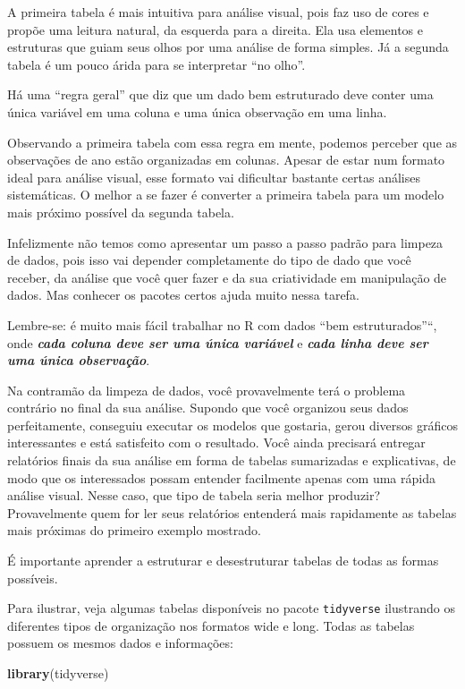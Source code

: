 \documentclass[]{book}
\newenvironment{Shaded}{\begin{snugshade}}{\end{snugshade}}
\newcommand{\KeywordTok}[1]{\textcolor[rgb]{0.13,0.29,0.53}{\textbf{#1}}}
\newcommand{\NormalTok}[1]{#1}
\begin{document}
A primeira tabela é mais intuitiva para análise visual, pois faz uso de
cores e propõe uma leitura natural, da esquerda para a direita. Ela usa
elementos e estruturas que guiam seus olhos por uma análise de forma
simples. Já a segunda tabela é um pouco árida para se interpretar ``no
olho''.

Há uma ``regra geral'' que diz que um dado bem estruturado deve conter
uma única variável em uma coluna e uma única observação em uma linha.

Observando a primeira tabela com essa regra em mente, podemos perceber
que as observações de ano estão organizadas em colunas. Apesar de estar
num formato ideal para análise visual, esse formato vai dificultar
bastante certas análises sistemáticas. O melhor a se fazer é converter a
primeira tabela para um modelo mais próximo possível da segunda tabela.

Infelizmente não temos como apresentar um passo a passo padrão para
limpeza de dados, pois isso vai depender completamente do tipo de dado
que você receber, da análise que você quer fazer e da sua criatividade
em manipulação de dados. Mas conhecer os pacotes certos ajuda muito
nessa tarefa.

Lembre-se: é muito mais fácil trabalhar no R com dados ``bem
estruturados''``, onde \textbf{\emph{cada coluna deve ser uma única
variável}} e \textbf{\emph{cada linha deve ser uma única observação}}.

Na contramão da limpeza de dados, você provavelmente terá o problema
contrário no final da sua análise. Supondo que você organizou seus dados
perfeitamente, conseguiu executar os modelos que gostaria, gerou
diversos gráficos interessantes e está satisfeito com o resultado. Você
ainda precisará entregar relatórios finais da sua análise em forma de
tabelas sumarizadas e explicativas, de modo que os interessados possam
entender facilmente apenas com uma rápida análise visual. Nesse caso,
que tipo de tabela seria melhor produzir? Provavelmente quem for ler
seus relatórios entenderá mais rapidamente as tabelas mais próximas do
primeiro exemplo mostrado.

É importante aprender a estruturar e desestruturar tabelas de todas as
formas possíveis.

Para ilustrar, veja algumas tabelas disponíveis no pacote
\texttt{tidyverse} ilustrando os diferentes tipos de organização nos
formatos wide e long. Todas as tabelas possuem os mesmos dados e
informações:

\begin{Shaded}
\begin{Highlighting}[]
\KeywordTok{library}\NormalTok{(tidyverse)}
\end{Highlighting}
\end{Shaded}
\end{document}
